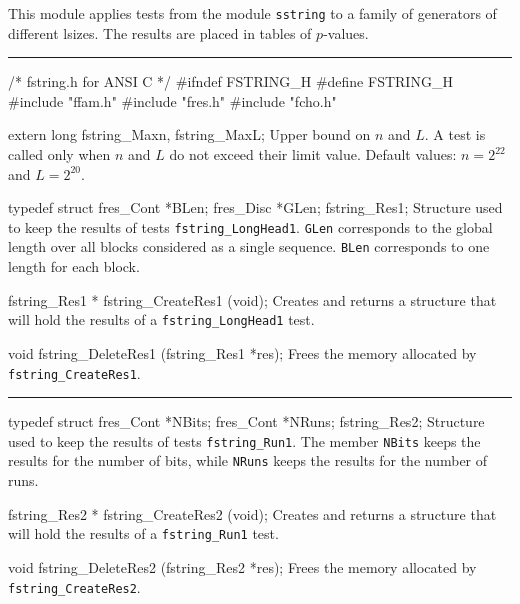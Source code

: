 
This module applies tests from the module {\tt sstring}
to a family of generators of different lsizes.
The results are placed in tables of $p$-values.

\bigskip
\hrule
\code\hide
/* fstring.h for ANSI C */
#ifndef FSTRING_H
#define FSTRING_H
\endhide
#include "ffam.h"
#include "fres.h"
#include "fcho.h"


extern long fstring_Maxn, fstring_MaxL;
\endcode
\tab
  Upper bound on $n$ and $L$.
  A test is called only when $n$ and $L$ do not exceed their limit value.
  Default values: $n = 2^{22}$ and $L = 2^{20}$.
\endtab


\ifdetailed  %


\code

typedef struct {
   fres_Cont *BLen;
   fres_Disc *GLen;
} fstring_Res1;
\endcode
 \tab  Structure used to keep the results of tests
  {\tt fstring\_LongHead1}. {\tt GLen} corresponds to the global length
  over all blocks considered as a single sequence. {\tt BLen} corresponds
  to one length for each block. 
 \endtab
\code


fstring_Res1 * fstring_CreateRes1 (void);
\endcode
 \tab 
  Creates and returns a structure that will hold the results
  of a  {\tt fstring\_LongHead1} test. 
 \endtab
\code


void fstring_DeleteRes1 (fstring_Res1 *res);
\endcode
 \tab 
  Frees the memory allocated by {\tt fstring\_CreateRes1}.
 \endtab
\bigskip\hrule\bigskip
\code

typedef struct {
   fres_Cont *NBits;
   fres_Cont *NRuns;
} fstring_Res2;
\endcode
 \tab  Structure used to keep the results of tests {\tt fstring\_Run1}.
  The member {\tt NBits} keeps the results for the number of
   bits, while {\tt NRuns} keeps the results for the number of runs.
 \endtab
\code


fstring_Res2 * fstring_CreateRes2 (void);
\endcode
 \tab 
  Creates and returns a structure that will hold the results
  of a  {\tt fstring\_Run1} test. 
 \endtab
\code


void fstring_DeleteRes2 (fstring_Res2 *res);
\endcode
 \tab 
  Frees the memory allocated by {\tt fstring\_CreateRes2}.
 \endtab

\fi %




\code

